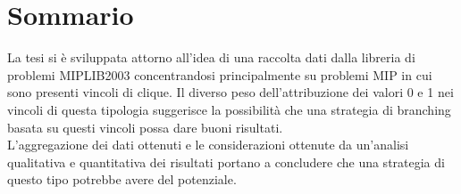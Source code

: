\documentclass[12pt,a4paper,twoside,openright]{book}
\begin{document}
\tableofcontents
\listoffigures




\frontmatter

\chapter{Sommario}
La tesi si è sviluppata attorno all’idea di una raccolta dati
dalla libreria di problemi MIPLIB2003 concentrandosi principalmente
su problemi MIP in cui sono presenti vincoli di clique. 
Il diverso peso dell’attribuzione dei valori 0 e 1 nei vincoli di 
questa tipologia suggerisce la possibilità che una strategia di branching basata 
su questi vincoli possa dare buoni risultati.
\\L'aggregazione dei dati ottenuti e le considerazioni ottenute da un'analisi 
qualitativa e quantitativa dei risultati portano a concludere che una strategia
di questo tipo potrebbe avere del potenziale.
\end{document}
